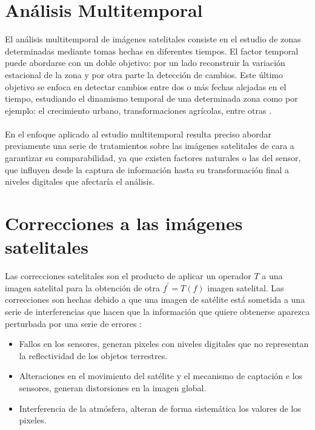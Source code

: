 \section{An\'alisis Multitemporal}
El an\'alisis multitemporal de im\'agenes satelitales consiste en el estudio de zonas determinadas mediante tomas hechas en diferentes tiempos. El factor temporal puede abordarse con un doble objetivo: por un lado reconstruir la variaci\'on estacional de la zona y por otra parte la detecci\'on de cambios. Este \'ultimo objetivo se enfoca en detectar cambios entre dos o m\'as
fechas alejadas en el tiempo, estudiando el dinamismo temporal de una determinada zona como por ejemplo: el crecimiento urbano, transformaciones agrícolas, entre otras \cite{salinero2002teledeteccion}.\\~\\
En el enfoque aplicado al estudio multitemporal resulta preciso abordar previamente una serie de tratamientos sobre las im\'agenes satelitales de cara a garantizar su comparabilidad, ya que existen factores naturales o las del sensor, que influyen desde la captura de informaci\'on hasta su transformaci\'on final a niveles digitales que afectar\'ia el an\'alisis.

\section{Correcciones a las im\'agenes satelitales}
Las correcciones satelitales son el producto de aplicar un operador $ T $ a una imagen satelital para la obtenci\'on de otra $ f^{'}=T(f) $ imagen satelital. Las correcciones son hechas debido a que una imagen de sat\'elite est\'a sometida a una serie de interferencias que hacen que la informaci\'on que quiere obtenerse aparezca perturbada por una serie de errores \cite{teledUm}:
	\begin{itemize}
		\item Fallos en los sensores, generan pixeles con niveles digitales que no representan la reflectividad de los objetos terrestres.
		\item Alteraciones en el movimiento del sat\'elite y el mecanismo de captaci\'on e los sensores, generan
		distorsiones en la imagen global.
		\item Interferencia de la atm\'osfera, alteran de forma sistem\'atica los valores de los pixeles.
	\end{itemize}


